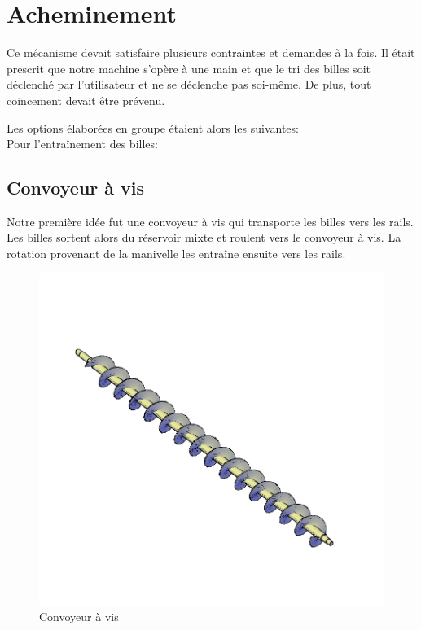 \section{Acheminement}
Ce mécanisme devait satisfaire plusieurs contraintes et demandes à la fois. Il était prescrit que notre machine s'opère à une main et que le tri des billes soit déclenché par l'utilisateur et ne se déclenche pas soi-même. De plus, tout coincement devait être prévenu.

Les options élaborées en groupe étaient alors les suivantes:\\
Pour l'entraînement des billes:

\subsection{Convoyeur à vis}
Notre première idée fut une convoyeur à vis qui transporte les billes vers les rails. Les billes sortent alors du réservoir mixte et roulent vers le convoyeur à vis. La rotation provenant de la manivelle les entraîne ensuite vers les rails.

\begin{figure}
    \centering
    \includegraphics[width=\textwidth]{Graphics/Images_concepts_Leon/795-Screw_conveyor.png}
    \caption{Convoyeur à vis}
\end{figure}

